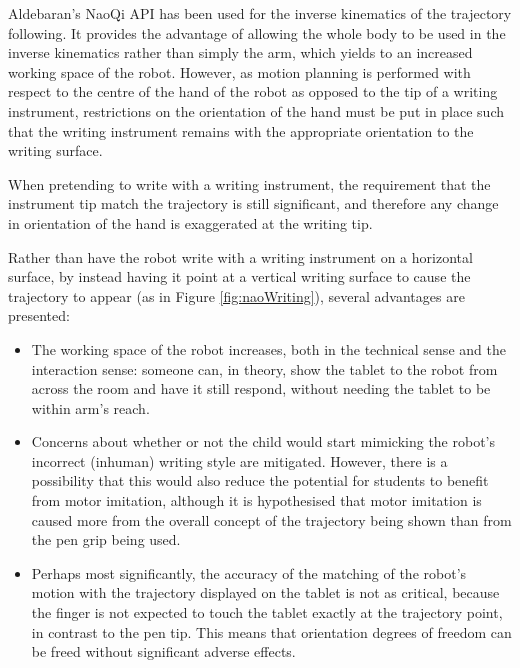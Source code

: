 \documentclass{sig-alternate}
\begin{document}
Aldebaran's NaoQi API has been used for the inverse kinematics of the trajectory
following. It provides the advantage of allowing the whole body to be used in
the inverse kinematics rather than simply the arm, which yields to an increased
working space of the robot. However, as motion planning is performed with
respect to the centre of the hand of the robot as opposed to the tip of a
writing instrument, restrictions on the orientation of the hand must be put in
place such that the writing instrument remains with the appropriate orientation
to the writing surface.

When pretending to write with a writing instrument, the requirement that the
instrument tip match the trajectory is still significant, and therefore any
change in orientation of the hand is exaggerated at the writing tip. 

Rather than have the robot write with a writing instrument on a horizontal
surface, by instead having it point at a vertical writing surface to cause the
trajectory to appear (as in Figure \ref{fig:naoWriting}), several advantages are
presented:

\begin{itemize}

    \item The working space of the robot increases, both in the technical sense
        and the interaction sense: someone can, in theory, show the tablet to
        the robot from across the room and have it still respond, without
        needing the tablet to be within arm's reach.

    \item Concerns about whether or not the child would start mimicking the
        robot's incorrect (inhuman) writing style are mitigated. However, there
        is a possibility that this would also reduce the potential for students
        to benefit from motor imitation, although it is hypothesised that motor
        imitation is caused more from the overall concept of the trajectory
        being shown than from the pen grip being used. 

    \item Perhaps most significantly, the accuracy of the matching of the
        robot's motion with the trajectory displayed on the tablet is not as
        critical, because the finger is not expected to touch the tablet exactly
        at the trajectory point, in contrast to the pen tip. This means that
        orientation degrees of freedom can be freed without significant adverse
        effects.

\end{itemize}
\end{document}

